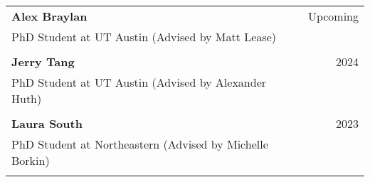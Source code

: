 \begin{longtable}{Xr}
	\textbf{Alex Braylan} & Upcoming \\
	PhD Student at UT Austin (Advised by Matt Lease) &  \\
	\\

	\textbf{Jerry Tang} & 2024 \\
	PhD Student at UT Austin (Advised by Alexander Huth) &  \\
	\\

	\textbf{Laura South} & 2023 \\
	PhD Student at Northeastern (Advised by Michelle Borkin) &  \\
	\\

\end{longtable}